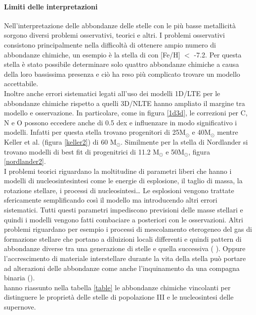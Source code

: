 \documentclass[12pt]{article}
\begin{document}
\paragraph{Limiti delle interpretazioni}
\label{limiti}

Nell’interpretazione delle abbondanze delle stelle con le più basse metallicità sorgono diversi problemi osservativi, teorici e altri. 
I problemi osservativi consistono principalmente nella difficoltà di ottenere ampio numero di abbondanze chimiche,  un esempio è la stella di \cite{keller} con [Fe/H] $<$ -7.2.
Per questa stella è stato possibile determinare solo quattro abbondanze chimiche a causa della loro bassissima presenza e ciò ha reso più complicato trovare un modello accettabile.\\ Inoltre anche errori sistematici legati all’uso dei modelli 1D/LTE per le abbondanze chimiche rispetto a quelli 3D/NLTE hanno ampliato il margine tra modello e osservazione. In particolare, come in figura \ref{1d3d}, le correzioni per C, N e O possono eccedere anche di 0.5 dex e influenzare in modo significativo i modelli. Infatti per questa stella \cite{ishigaki} trovano progenitori di 25M$_{\odot}$  e 40M$_{\odot}$  mentre Keller et al. (figura \ref{keller2}) di 60 M$_{\odot}$.
Similmente per la stella di Nordlander si trovano modelli di best fit di progenitrici di 11.2 M$_{\odot}$  e 50M$_{\odot}$, figura \ref{nordlander2}.\\
I problemi teorici riguardano la moltitudine di parametri liberi che hanno i modelli di nucleosintesintesi come le energie di esplosione, il taglio di massa, la rotazione stellare, i processi di nucleosintesi…
Le esplosioni vengono trattate sfericamente semplificando così il modello ma introducendo altri errori sistematici. Tutti questi parametri impediscono previsioni delle masse stellari e quindi i modelli vengono fatti combaciare a posteriori con le osservazioni.  
Altri problemi riguardano per esempio i processi di mescolamento eterogeneo del gas di formazione stellare che portano a diluizioni locali differenti e quindi pattern di abbondanze diverse tra una generazione di stelle e quella successiva ( \cite{Ritter}). Oppure l’accrescimento di materiale interstellare durante la vita della stella può portare ad alterazioni delle abbondanze come anche l’inquinamento da una compagna binaria (\cite{Hattori}). \\
\cite{principale} hanno riassunto nella tabella \ref{table} le abbondanze chimiche vincolanti per distinguere le proprietà delle stelle di popolazione III e le nucleosintesi delle supernove. 
\end{document}
